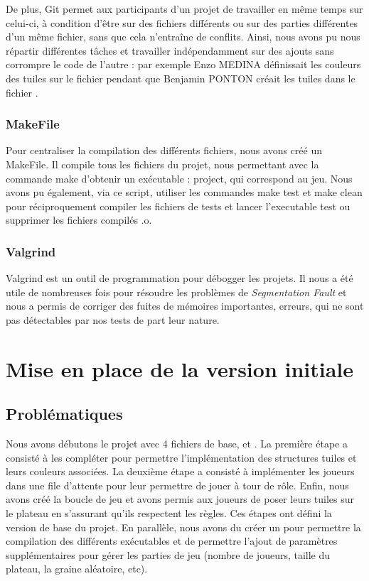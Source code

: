 \documentclass[a4paper]{article}
\begin{document}
De plus, Git permet aux participants d’un projet de travailler en même temps sur celui-ci, à condition d’être sur des fichiers différents ou sur des parties différentes d'un même fichier, sans que cela n'entraîne de conflits. Ainsi, nous avons pu nous répartir différentes tâches et travailler indépendamment sur des ajouts sans corrompre le code de l'autre : par exemple Enzo MEDINA définissait les couleurs des tuiles sur le fichier  pendant que Benjamin PONTON créait les tuiles dans le fichier .

\subsubsection{MakeFile}
Pour centraliser la compilation des différents fichiers, nous avons créé un MakeFile. Il compile tous les fichiers du projet, nous permettant avec la commande \colorbox{mygray}{make} d'obtenir un exécutable : project, qui correspond au jeu. Nous avons pu également, via ce script, utiliser les commandes \colorbox{mygray}{make test} et \colorbox{mygray}{make clean} pour réciproquement compiler les fichiers de tests et lancer l'executable test ou supprimer les fichiers compilés .o. 

\subsubsection{Valgrind}
Valgrind est un outil de programmation pour débogger les projets. Il nous a été utile de nombreuses fois pour résoudre les problèmes de \emph{Segmentation Fault} et nous a permis de corriger des fuites de mémoires importantes, erreurs, qui ne sont pas détectables par nos tests de part leur nature.  

\section{Mise en place de la version initiale}

\subsection{Problématiques}
Nous avons débutons le projet avec 4 fichiers de base,  et . La première étape a consisté à les compléter pour permettre l'implémentation des structures tuiles et leurs couleurs associées. La deuxième étape a consisté à implémenter les joueurs dans une file d'attente pour leur permettre de jouer à tour de rôle. Enfin, nous avons créé la boucle de jeu et avons permis aux joueurs de poser leurs tuiles sur le plateau en s'assurant qu'ils respectent les règles. Ces étapes ont défini la version de base du projet.
En parallèle, nous avons du créer un  pour permettre la compilation des différents exécutables et de permettre l'ajout de paramètres supplémentaires pour gérer les parties de jeu (nombre de joueurs, taille du plateau, la graine aléatoire, etc).
\end{document}

